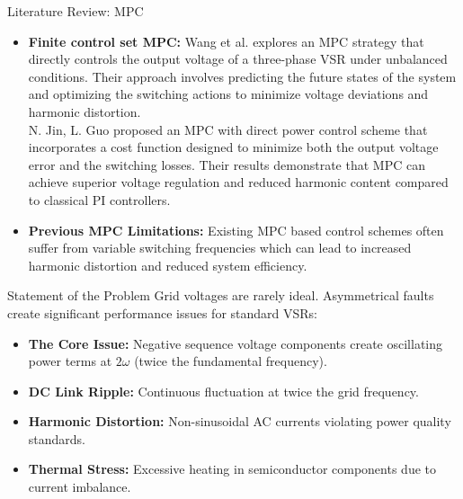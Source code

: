 \documentclass[aspectratio=169]{beamer}
\begin{document}
\begin{frame}{Literature Review: MPC }
    \begin{itemize}
        \item \textbf{Finite control set MPC:} Wang et al. explores an MPC strategy that directly
            controls the output voltage of a three-phase VSR under unbalanced conditions. Their approach
            involves predicting the future states of the system and optimizing the switching actions to
            minimize voltage deviations and harmonic distortion.\\
            \vspace{0.3cm}
            N. Jin, L. Guo proposed an MPC with direct power control scheme that incorporates a cost function designed to minimize
            both the output voltage error and the switching losses. Their results demonstrate that MPC
            can achieve superior voltage regulation and reduced harmonic content compared to classical PI
            controllers.
        \item \textbf{Previous MPC Limitations:} Existing MPC based control schemes often suffer from 
        variable switching frequencies which can lead to increased harmonic distortion and reduced system efficiency.
    \end{itemize}
\end{frame}  

\begin{frame}{Statement of the Problem}
    Grid voltages are rarely ideal. Asymmetrical faults create significant performance issues for standard VSRs:
    \vspace{0.3cm}
    \begin{itemize}
        \item \textbf{The Core Issue:} Negative sequence voltage components create oscillating power terms at $2\omega$ (twice the fundamental frequency).
        \item \textbf{DC Link Ripple:} Continuous fluctuation at twice the grid frequency.
        \item \textbf{Harmonic Distortion:} Non-sinusoidal AC currents violating power quality standards.
        \item \textbf{Thermal Stress:} Excessive heating in semiconductor components due to current imbalance.
    \end{itemize}
\end{frame}
\end{document}
